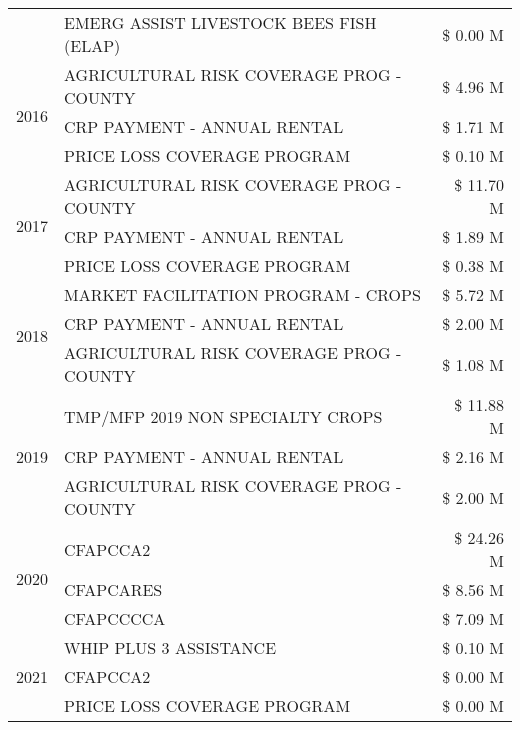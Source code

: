 \begin{tabular}{llr}
 & EMERG ASSIST LIVESTOCK BEES FISH (ELAP) & \$ 0.00 M \\
\cline{1-3}
\multirow[t]{3}{*}{2016} & AGRICULTURAL RISK COVERAGE PROG - COUNTY & \$ 4.96 M \\
 & CRP PAYMENT - ANNUAL RENTAL & \$ 1.71 M \\
 & PRICE LOSS COVERAGE PROGRAM & \$ 0.10 M \\
\cline{1-3}
\multirow[t]{3}{*}{2017} & AGRICULTURAL RISK COVERAGE PROG - COUNTY & \$ 11.70 M \\
 & CRP PAYMENT - ANNUAL RENTAL & \$ 1.89 M \\
 & PRICE LOSS COVERAGE PROGRAM & \$ 0.38 M \\
\cline{1-3}
\multirow[t]{3}{*}{2018} & MARKET FACILITATION PROGRAM - CROPS & \$ 5.72 M \\
 & CRP PAYMENT - ANNUAL RENTAL & \$ 2.00 M \\
 & AGRICULTURAL RISK COVERAGE PROG - COUNTY & \$ 1.08 M \\
\cline{1-3}
\multirow[t]{3}{*}{2019} & TMP/MFP 2019 NON SPECIALTY CROPS & \$ 11.88 M \\
 & CRP PAYMENT - ANNUAL RENTAL & \$ 2.16 M \\
 & AGRICULTURAL RISK COVERAGE PROG - COUNTY & \$ 2.00 M \\
\cline{1-3}
\multirow[t]{3}{*}{2020} & CFAPCCA2 & \$ 24.26 M \\
 & CFAPCARES & \$ 8.56 M \\
 & CFAPCCCCA & \$ 7.09 M \\
\cline{1-3}
\multirow[t]{3}{*}{2021} & WHIP PLUS 3 ASSISTANCE & \$ 0.10 M \\
 & CFAPCCA2 & \$ 0.00 M \\
 & PRICE LOSS COVERAGE PROGRAM & \$ 0.00 M \\
\cline{1-3}
\bottomrule
\end{tabular}
